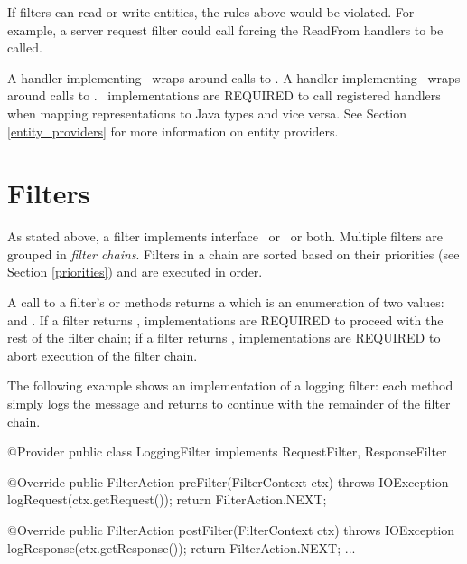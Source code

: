 \begin{ednote}
If filters can read or write entities, the rules above would be violated. For example, a server request filter could call  forcing the ReadFrom handlers to be called. 
\end{ednote}

A handler implementing \ReadFromHandler\ wraps around calls to . A handler implementing \WriteToHandler\ wraps around calls to . \jaxrs\ implementations are REQUIRED to call registered handlers when mapping representations to Java types and vice versa. See Section \ref{entity_providers} for more information on entity providers.

\section{Filters}
\label{filters}

As stated above, a filter implements interface \RequestFilter\ or \ResponseFilter\ or both. Multiple filters are grouped in \emph{filter chains}. Filters in a chain are sorted based on their priorities (see Section \ref{priorities}) and are executed in order. 

A call to a filter's  or  methods returns a  which is an enumeration of two values:  and . If a filter returns , implementations are REQUIRED to proceed with the rest of the filter chain; if a filter returns , implementations are REQUIRED to abort execution of the filter chain. 

The following example shows an implementation of a logging filter: each method simply logs the message and returns  to continue with the remainder of the filter chain.

\begin{listing}{1}
@Provider
public class LoggingFilter implements RequestFilter, ResponseFilter {

    @Override
    public FilterAction preFilter(FilterContext ctx) throws IOException {
        logRequest(ctx.getRequest());
        return FilterAction.NEXT;
    }

    @Override
    public FilterAction postFilter(FilterContext ctx) throws IOException {
        logResponse(ctx.getResponse());
        return FilterAction.NEXT;
    }
    ...
}
\end{listing}

